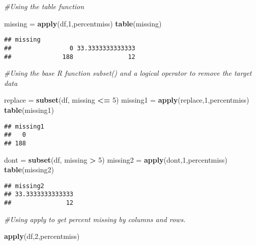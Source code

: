 \documentclass[
]{article}
\newenvironment{Shaded}{\begin{snugshade}}{\end{snugshade}}
\newcommand{\CommentTok}[1]{\textcolor[rgb]{0.56,0.35,0.01}{\textit{#1}}}
\newcommand{\DecValTok}[1]{\textcolor[rgb]{0.00,0.00,0.81}{#1}}
\newcommand{\KeywordTok}[1]{\textcolor[rgb]{0.13,0.29,0.53}{\textbf{#1}}}
\newcommand{\NormalTok}[1]{#1}
\newcommand{\OperatorTok}[1]{\textcolor[rgb]{0.81,0.36,0.00}{\textbf{#1}}}
\newcommand{\StringTok}[1]{\textcolor[rgb]{0.31,0.60,0.02}{#1}}
\begin{document}
\begin{Shaded}
\begin{Highlighting}[]
\CommentTok{#Using the table function}

\NormalTok{missing =}\StringTok{ }\KeywordTok{apply}\NormalTok{(df,}\DecValTok{1}\NormalTok{,percentmiss)}
\KeywordTok{table}\NormalTok{(missing)}
\end{Highlighting}
\end{Shaded}

\begin{verbatim}
## missing
##                0 33.3333333333333 
##              188               12
\end{verbatim}

\begin{Shaded}
\begin{Highlighting}[]
\CommentTok{#Using the base R function subset() and a logical operator to remove the target data}

\NormalTok{replace =}\StringTok{ }\KeywordTok{subset}\NormalTok{(df, missing }\OperatorTok{<=}\StringTok{ }\DecValTok{5}\NormalTok{)}
\NormalTok{missing1 =}\StringTok{ }\KeywordTok{apply}\NormalTok{(replace,}\DecValTok{1}\NormalTok{,percentmiss)}
\KeywordTok{table}\NormalTok{(missing1)}
\end{Highlighting}
\end{Shaded}

\begin{verbatim}
## missing1
##   0 
## 188
\end{verbatim}

\begin{Shaded}
\begin{Highlighting}[]
\NormalTok{dont =}\StringTok{ }\KeywordTok{subset}\NormalTok{(df, missing }\OperatorTok{>}\StringTok{ }\DecValTok{5}\NormalTok{)}
\NormalTok{missing2 =}\StringTok{ }\KeywordTok{apply}\NormalTok{(dont,}\DecValTok{1}\NormalTok{,percentmiss)}
\KeywordTok{table}\NormalTok{(missing2)}
\end{Highlighting}
\end{Shaded}

\begin{verbatim}
## missing2
## 33.3333333333333 
##               12
\end{verbatim}

\begin{Shaded}
\begin{Highlighting}[]
\CommentTok{#Using apply to get percent missing by columns and rows.}

\KeywordTok{apply}\NormalTok{(df,}\DecValTok{2}\NormalTok{,percentmiss)}
\end{Highlighting}
\end{Shaded}
\end{document}
